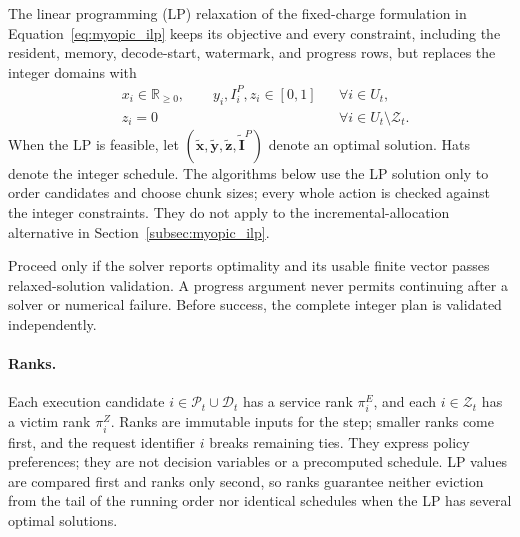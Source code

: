 \documentclass[11pt]{article}
\begin{document}
The linear programming (LP) relaxation of the fixed-charge formulation in Equation~\ref{eq:myopic_ilp} keeps its objective and every constraint, including the resident, memory, decode-start, watermark, and progress rows, but replaces the integer domains with
\[
\begin{aligned}
&x_i\in\mathbb{R}_{\ge0},\qquad y_i,I_i^P,z_i\in[0,1]
&&\forall i\in U_t,\\
&z_i=0
&&\forall i\in U_t\setminus\mathcal{Z}_t.
\end{aligned}
\]
When the LP is feasible, let \((\tilde{\mathbf{x}},\tilde{\mathbf{y}},\tilde{\mathbf{z}},\tilde{\mathbf{I}}^P)\) denote an optimal solution. Hats denote the integer schedule. The algorithms below use the LP solution only to order candidates and choose chunk sizes; every whole action is checked against the integer constraints. They do not apply to the incremental-allocation alternative in Section~\ref{subsec:myopic_ilp}.

Proceed only if the solver reports optimality and its usable finite vector passes relaxed-solution validation. A progress argument never permits continuing after a solver or numerical failure. Before success, the complete integer plan is validated independently.

\paragraph{Ranks.}
Each execution candidate \(i\in\mathcal{P}_t\cup\mathcal{D}_t\) has a service rank \(\pi_i^E\), and each \(i\in\mathcal{Z}_t\) has a victim rank \(\pi_i^Z\). Ranks are immutable inputs for the step; smaller ranks come first, and the request identifier \(i\) breaks remaining ties. They express policy preferences; they are not decision variables or a precomputed schedule. LP values are compared first and ranks only second, so ranks guarantee neither eviction from the tail of the running order nor identical schedules when the LP has several optimal solutions.
\end{document}
